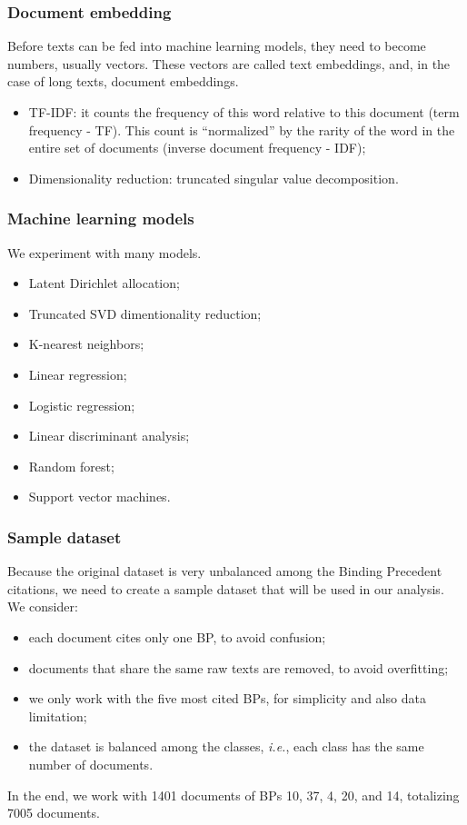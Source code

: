 \documentclass{beamer}
\newcommand{\ie}{\textit{i.e.}}
\begin{document}
    \begin{frame}
        \frametitle{Document embedding}
        Before texts can be fed into machine learning models, they need to become numbers, usually vectors. These vectors are called text embeddings, and, in the case of long texts, document embeddings. \pause
        \begin{itemize}
            \item TF-IDF: it counts the frequency of this word relative to this document (term frequency - TF). This count is ``normalized'' by the rarity of the word in the entire set of documents (inverse document frequency - IDF); \pause
            \item Dimensionality reduction: truncated singular value decomposition.
        \end{itemize}
    \end{frame}

    \begin{frame}
        \frametitle{Machine learning models}
        We experiment with many models.
        \begin{itemize}
            \item Latent Dirichlet allocation;
            \item Truncated SVD dimentionality reduction;
            \item K-nearest neighbors;
            \item Linear regression;
            \item Logistic regression;
            \item Linear discriminant analysis;
            \item Random forest;
            \item Support vector machines.
        \end{itemize}
    \end{frame}

    \begin{frame}
        \frametitle{Sample dataset}
        Because the original dataset is very unbalanced among the Binding Precedent citations, we need to create a sample dataset that will be used in our analysis. We consider: \pause
        \begin{itemize}
            \item each document cites only one BP, to avoid confusion;\pause
            \item documents that share the same raw texts are removed, to avoid overfitting;\pause
            \item we only work with the five most cited BPs, for simplicity and also data limitation;\pause
            \item the dataset is balanced among the classes, \ie, each class has the same number of documents.\pause
        \end{itemize}
        In the end, we work with 1401 documents of BPs 10, 37, 4, 20, and 14, totalizing 7005 documents.
    \end{frame}
\end{document}
